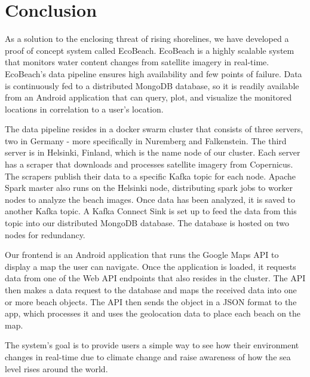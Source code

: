 \chapter{Conclusion}

As a solution to the enclosing threat of rising shorelines, we have developed a proof of concept system called EcoBeach. EcoBeach is a highly scalable system that monitors water content changes from satellite imagery in real-time. EcoBeach's data pipeline ensures high availability and few points of failure. Data is continuously fed to a distributed MongoDB database, so it is readily available from an Android application that can query, plot, and visualize the monitored locations in correlation to a user's location.

The data pipeline resides in a docker swarm cluster that consists of three servers, two in Germany - more specifically in Nuremberg and Falkenstein. The third server is in Helsinki, Finland, which is the name node of our cluster. Each server has a scraper that downloads and processes satellite imagery from Copernicus. The scrapers publish their data to a specific Kafka topic for each node. Apache Spark master also runs on the Helsinki node, distributing spark jobs to worker nodes to analyze the beach images. 
Once data has been analyzed, it is saved to another Kafka topic. A Kafka Connect Sink is set up to feed the data from this topic into our distributed MongoDB database. The database is hosted on two nodes for redundancy.

Our frontend is an Android application that runs the Google Maps API to display a map the user can navigate. Once the application is loaded, it requests data from one of the Web API endpoints that also resides in the cluster. The API then makes a data request to the database and maps the received data into one or more beach objects. The API then sends the object in a JSON format to the app, which processes it and uses the geolocation data to place each beach on the map.

The system's goal is to provide users a simple way to see how their environment changes in real-time due to climate change and raise awareness of how the sea level rises around the world. 